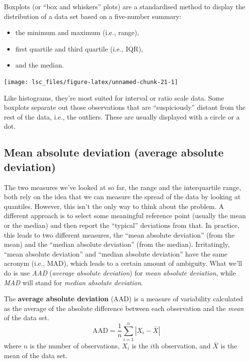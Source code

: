 \documentclass[
  11pt,
  a4paper,
  twoside,symmetric,openright]{book}
\providecommand{\tightlist}{%
  \setlength{\itemsep}{0pt}\setlength{\parskip}{0pt}}
\theoremstyle{break}
\theoremstyle{break}
\begin{document}
\hypertarget{boxplot}{}
\begin{callout}[Boxplots]

Boxplots (or ``box and whiskers'' plots) are a standardised method to display the distribution of a data set based on a five-number summary:

\begin{itemize}
\tightlist
\item
  the minimum and maximum (i.e., range),
\item
  first quartile and third quartile (i.e., IQR),
\item
  and the median.
\end{itemize}

\begin{center}\texttt{[image: lsc\_files/figure-latex/unnamed-chunk-21-1]} \end{center}

Like histograms, they're most suited for interval or ratio scale data. Some boxplots separate out those observations that are ``suspiciously'' distant from the rest of the data, i.e., the outliers. These are usually displayed with a circle or a dot.

\end{callout}

\hypertarget{aad}{%
\subsection{Mean absolute deviation (average absolute deviation)}\label{aad}}

The two measures we've looked at so far, the range and the interquartile range, both rely on the idea that we can measure the spread of the data by looking at quantiles. However, this isn't the only way to think about the problem. A different approach is to select some meaningful reference point (usually the mean or the median) and then report the ``typical'' deviations from that. In practice, this leads to two different measures, the ``mean absolute deviation'' (from the mean) and the ``median absolute deviation'' (from the median). Irritatingly, ``mean absolute deviation'' and ``median absolute deviation'' have the same acronym (i.e., MAD), which leads to a certain amount of ambiguity. What we'll do is use \emph{AAD} (\emph{average absolute deviation}) for \emph{mean absolute deviation}, while \emph{MAD} will stand for \emph{median absolute deviation}.

\begin{definition}
\protect\hypertarget{def:defAAD}{}\label{def:defAAD}The \textbf{average absolute deviation} (AAD) is a measure of variability calculated as the average of the absolute difference between each observation and the \emph{mean} of the data set.
\[
\text{AAD} = \frac{1}{n} \sum_{i=1}^n |X_i - \bar{X}|
\]
where \(n\) is the number of observations, \(X_i\) is the \(i\)th observation, and \(\bar{X}\) is the mean of the data set.
\end{definition}
\end{document}
